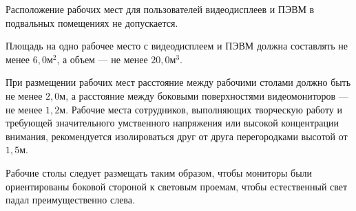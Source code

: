 Расположение рабочих мест для пользователей видеодисплеев и ПЭВМ в подвальных помещениях не допускается.\cite{mihnuk07}

Площадь на одно рабочее место с видеодисплеем и ПЭВМ должна составлять не менее \(6,0 \text{м}^2\), а объем --- не менее \(20,0 \text{м}^3\).\cite{mihnuk07}

При размещении рабочих мест расстояние между рабочими столами должно быть не менее \(2,0 \text{м}\), а расстояние между боковыми поверхностями видеомониторов --- не менее \(1,2 \text{м}\). Рабочие места сотрудников, выполняющих творческую работу и требующей значительного умственного напряжения или высокой концентрации внимания, рекомендуется изолироваться друг от друга перегородками высотой от \(1,5 \text{м}\).\cite{mihnuk07}

Рабочие столы следует размещать таким образом, чтобы мониторы были ориентированы боковой стороной к световым проемам, чтобы естественный свет падал преимущественно слева.
\newpage
